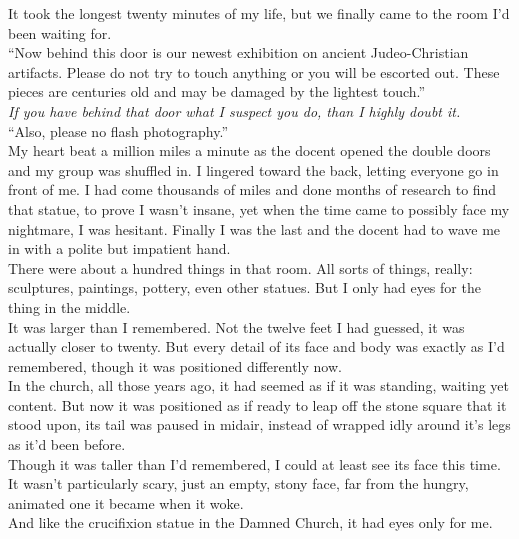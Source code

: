 \documentclass[a5paper]{scrartcl}
\begin{document}
It took the longest twenty minutes of my life, but we finally came to the room I'd been waiting for.\\


\enquote{Now behind this door is our newest exhibition on ancient Judeo-Christian artifacts. Please do not try to touch anything or you will be escorted out. These pieces are centuries old and may be damaged by the lightest touch.}\\


\textit{If you have behind that door what I suspect you do, than I 
highly doubt it.}
\\


\enquote{Also, please no flash photography.}\\


My heart beat a million miles a minute as the docent opened the double doors and my group was shuffled in. I lingered toward the back, letting everyone go in front of me.
I had come thousands of miles and done months of research to find that statue, to prove I wasn't insane, yet when the time came to possibly face my nightmare, I was hesitant.
Finally I was the last and the docent had to wave me in with a polite but impatient hand.\\


There were about a hundred things in that room. All sorts of things, really: sculptures, paintings, pottery, even other statues. But I only had eyes for the thing in the middle.\\


It was larger than I remembered. Not the twelve feet I had guessed, it was actually closer to twenty. But every detail of its face and body was exactly as I'd remembered, though it was positioned differently now.\\


In the church, all those years ago, it had seemed as if it was standing, waiting yet content. But now it was positioned as if ready to leap off the stone square that it stood upon, its tail was paused in midair, instead of wrapped idly around it's legs as it'd been before.\\


Though it was taller than I'd remembered, I could at least see its face this time. It wasn't particularly scary, just an empty, stony face, far from the hungry, animated one it became when it woke.\\


And like the crucifixion statue in the Damned Church, it had eyes only for me.\\
\end{document}
